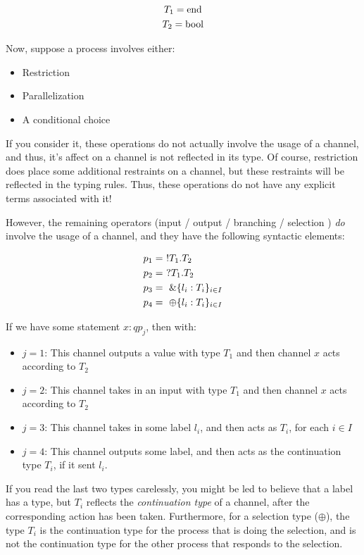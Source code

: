 \begin{gather*}
T_1 = \text{end} \\
T_2 = \text{bool}
\end{gather*}


Now, suppose a process involves either:
\begin{itemize}
    \item Restriction
    \item Parallelization
    \item A conditional choice
\end{itemize}

If you consider it, these operations do not actually involve the usage of a channel, and thus, it's affect on a channel is not reflected in its type. Of course, restriction does place some additional restraints on a channel, but these restraints will be reflected in the typing rules. Thus, these operations do not have any explicit terms associated with it!

However, the remaining operators (input / output / branching / selection ) \textit{do} involve the usage of a channel, and they have the following syntactic elements:

\begin{align*}
p_1 &=\ !T_1.T_2 \\
p_2 &=\ ?T_1.T_2 \\
p_3 &=\ \&\{l_i : T_i\}_{i \in I} \\
p_4 &=\ \oplus \{l_i : T_i\}_{i \in I} \\
 \end{align*}

If we have some statement $x : q p_j$, then with:
\begin{itemize}
    \item $j = 1$: This channel outputs a value with type $T_1$ and then channel $x$ acts according to $T_2$
    \item $j = 2$: This channel takes in an input with type $T_1$ and then channel $x$ acts according to $T_2$
    \item $j = 3$: This channel takes in some label $l_i$, and then acts as $T_i$, for each $i \in I$
    \item $j = 4$: This channel outputs some label, and then acts as the continuation type $T_i$, if it sent $l_i$.
\end{itemize}

If you read the last two types carelessly, you might be led to believe that a label has a type, but $T_i$ reflects the \textit{continuation type} of a channel, after the corresponding action has been taken. Furthermore, for a selection type ($\oplus$), the type $T_i$ is the continuation type for the process that is doing the selection, and is not the continuation type for the other process that responds to the selection.

